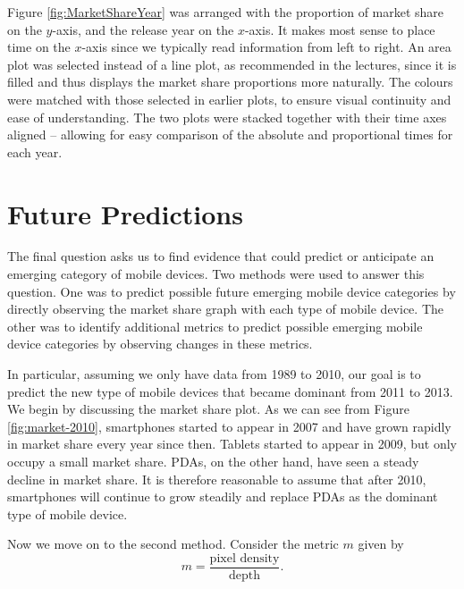\documentclass[conference]{IEEEtran}
\begin{document}
Figure \ref{fig:MarketShareYear}
was arranged with the proportion of market share on the $y$-axis, and the release year on the $x$-axis.
It makes most sense to place time on the $x$-axis since we typically read
information from left to right.
An area plot was selected instead of a line plot, as recommended in the lectures,
since it is filled and thus displays the market share proportions more naturally.
The colours were matched with those selected in earlier plots, to ensure visual continuity and ease of understanding.
The two plots were stacked together with their time axes aligned -- allowing for easy comparison of the absolute and proportional times for each year.

\section{Future Predictions}
The final question asks us to find evidence that could predict or anticipate an emerging category of mobile devices.
Two methods were used to answer this question. One was to predict possible future emerging mobile device categories by directly observing the market share graph with each type of mobile device. The other was to identify additional metrics to predict possible emerging mobile device categories by observing changes in these metrics.

In particular, assuming we only have data from 1989 to 2010, our goal is to predict the new type of mobile devices that became dominant from 2011 to 2013.
We begin by discussing the market share plot.
As we can see from Figure \ref{fig:market-2010}, smartphones started to appear in 2007 and have grown rapidly in market share every year since then. Tablets started to appear in 2009, but only occupy a small market share. PDAs, on the other hand, have seen a steady decline in market share. It is therefore reasonable to assume that after 2010, smartphones will continue to grow steadily and replace PDAs as the dominant type of mobile device.

Now we move on to the second method. Consider the metric $m$ given by
\[ m = \frac{\text{pixel density}}{\text{depth}}. \]
\end{document}
